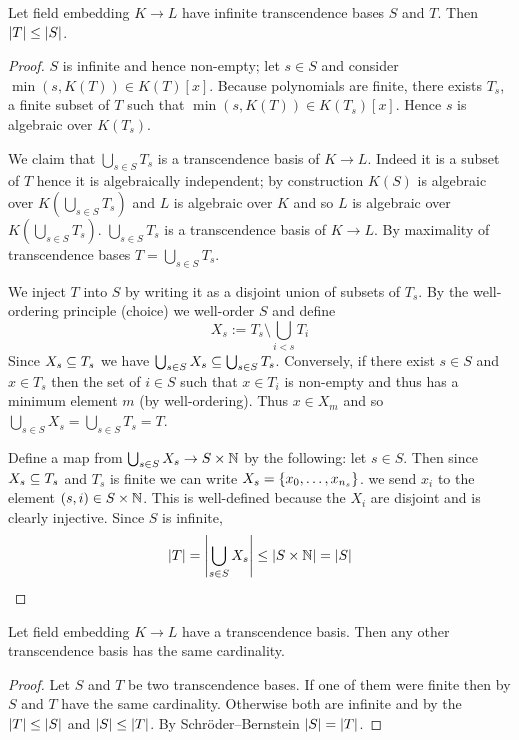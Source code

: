 \begin{lem}
    Let field embedding $K \to L$ have infinite transcendence bases $S$
    and $T$.
    Then $\left\vert T \right\vert \leq \left\vert S \right\vert$.
\end{lem}
\begin{proof}
    $S$ is infinite and hence non-empty;
    let $s \in S$ and consider $\min(s, K(T)) \in K(T)[x]$.
    Because polynomials are finite, 
    there exists $T_s$, a finite subset of $T$ such that 
    $\min(s, K(T)) \in K(T_s)[x]$.
    Hence $s$ is algebraic over $K(T_s)$.

    We claim that $\bigcup_{s \in S} T_s$ is a transcendence basis of $K \to L$.
    Indeed it is a subset of $T$ hence it is algebraically independent;
    by construction $K(S)$ is algebraic over 
    $K(\bigcup_{s \in S} T_s)$ and $L$ is algebraic over $K$ and so 
    $L$ is algebraic over $K(\bigcup_{s \in S} T_s)$.
    $\bigcup_{s \in S} T_s$ is a transcendence basis of $K \to L$.
    By maximality of transcendence bases $T = \bigcup_{s \in S} T_s$.

    We inject $T$ into $S$ 
    by writing it as a disjoint union of subsets of $T_s$.
    By the well-ordering principle (choice) we well-order $S$
    and define
    \[X_s := T_s \setminus \bigcup_{i < s} T_i\]
    Since $X_s \subseteq T_s$ we have 
    $\bigcup_{s \in S} X_s \subseteq \bigcup_{s \in S} T_s$.
    Conversely, if there exist $s \in S$ and $x \in T_s$ then
    the set of $i \in S$ such that $x \in T_i$ is non-empty and thus has a 
    minimum element $m$ (by well-ordering).
    Thus $x \in X_m$ and so 
    $\bigcup_{s \in S} X_s = \bigcup_{s \in S} T_s = T$.

    Define a map from $\bigcup_{s \in S} X_s \to S \times \mathbb{N}$ by the following:
    let $s \in S$. 
    Then since $X_s \subseteq T_s$ and $T_s$ is finite
    we can write $X_s = \left\{x_0, \dots, x_{n_s}\right\}$.
    we send $x_i$ to the element $(s,i) \in S \times \mathbb{N}$.
    This is well-defined because the $X_i$ are disjoint
    and is clearly injective.
    Since $S$ is infinite,
    \[\left\vert T \right\vert = \left\vert \bigcup_{s \in S} X_s \right\vert \leq \left\vert S \times \mathbb{N} \right\vert = \left\vert S \right\vert\]
\end{proof}

\begin{prop}
    Let field embedding $K \to L$ have a transcendence basis.
    Then any other transcendence basis has the same cardinality.
\end{prop}
\begin{proof}
    Let $S$ and $T$ be two transcendence bases.
    If one of them were finite then by 
    $S$ and $T$ have the same cardinality.
    Otherwise both are infinite and
    by the  
    $\left\vert T \right\vert \leq \left\vert S \right\vert$
    and $\left\vert S \right\vert \leq \left\vert T \right\vert$.
    By Schröder–Bernstein $\left\vert S \right\vert = \left\vert T \right\vert$.
\end{proof}

